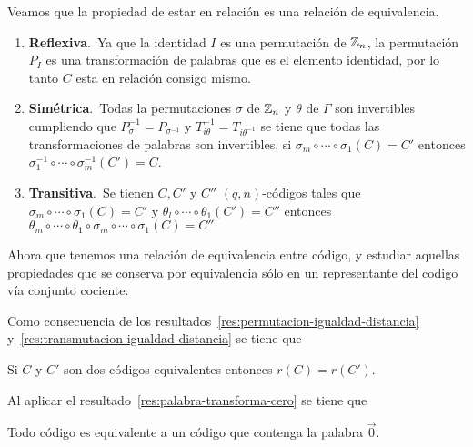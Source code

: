 Veamos que la propiedad de estar en relación es una relación de equivalencia.
\begin{enumerate}
	\item \textbf{Reflexiva}.\ Ya que la identidad $I$ es una permutación de $\mathbb{Z}_n$, la permutación $P_I$ es una transformación de palabras que es el elemento identidad, por lo tanto $C$ esta en relación consigo mismo.
	\item \textbf{Simétrica}.\ Todas la permutaciones $\sigma$ de $\mathbb{Z}_n$ y $\theta$ de $\Gamma$ son invertibles cumpliendo que $P_\sigma^{-1}=P_{\sigma^{-1}}$ y $T_{i\theta}^{-1}=T_{i\theta^{-1}}$ se tiene que todas las transformaciones de palabras son invertibles, si $\sigma_m\circ\cdots\circ \sigma_1(C)= C'$ entonces $\sigma_1^{-1}\circ\cdots\circ \sigma_m^{-1}(C')= C$.
	\item \textbf{Transitiva}.\ Se tienen $C, C'$ y $C''$ $(q, n)$-códigos tales que $\sigma_m\circ\cdots\circ \sigma_1(C)= C'$ y $\theta_l\circ\cdots\circ \theta_1(C')= C''$ entonces $\theta_m\circ\cdots\circ \theta_1\circ\sigma_m\circ\cdots\circ \sigma_1(C)= C''$
\end{enumerate}

Ahora que tenemos una relación de equivalencia entre código, y estudiar aquellas propiedades que se conserva por equivalencia sólo en un representante del codigo vía conjunto cociente.

Como consecuencia de los resultados~\eqref{res:permutacion-igualdad-distancia} y~\eqref{res:transmutacion-igualdad-distancia} se tiene que
\begin{lemma}
	Si $C$ y $C'$ son dos códigos equivalentes entonces $r(C)=r(C')$.
\end{lemma}
Al aplicar el resultado~\eqref{res:palabra-transforma-cero} se tiene que
\begin{lemma}
	Todo código es equivalente a un código que contenga la palabra $\vec{0}$.
\end{lemma}

